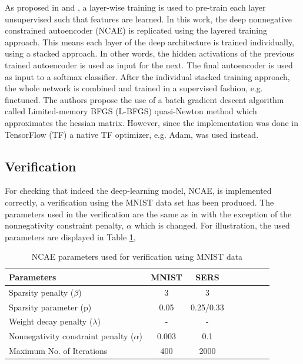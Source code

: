 \documentclass{article}
\begin{document}
As proposed in \cite{Hosseini-Asl2016} and \cite{Vincent}, a layer-wise training is used to pre-train each layer unsupervised such that features are learned. In this work, the deep nonnegative constrained autoencoder (NCAE) is replicated using the layered training approach. This means each layer of the deep architecture is trained individually, using a stacked approach. In other words, the hidden activations of the previous trained autoencoder is used as input for the next. The final autoencoder is used as input to a softmax classifier. After the individual stacked training approach, the whole network is combined and trained in a supervised fashion, e.g. finetuned. The authors propose the use of a batch gradient descent algorithm called Limited-memory BFGS (L-BFGS) quasi-Newton method which approximates the hessian matrix. However, since the implementation was done in TensorFlow (TF) a native TF optimizer, e.g. Adam, was used instead. 

\subsection{Verification}

For checking that indeed the deep-learning model, NCAE, is implemented correctly, a verification using the MNIST data set has been produced. The parameters used in the verification are the same as in \cite{Hosseini-Asl2016} with the exception of the nonnegativity constraint penalty, $\alpha$ which is changed. For illustration, the used parameters are displayed in Table \ref{tab:parameters},

\begin{table}[h]
	\centering
\begin{tabular}{l*{6}{c}r}
	\hline
	Parameters             & MNIST & SERS \\
	\hline
	Sparsity penalty ($\beta$) & 3 & 3\\
	\hline
	Sparsity parameter (p)            & 0.05 & 0.25/0.33  \\
	\hline
	Weight decay penalty ($\lambda$)           & - & - \\
	\hline
	Nonnegativity constraint penalty ($\alpha$)     & 0.003 & 0.1\\
	\hline
	Maximum No. of Iterations & 400 & 2000\\
	\hline
\end{tabular}
   \caption{NCAE parameters used for verification using MNIST data}
\label{tab:parameters} 
\end{table}
\end{document}
